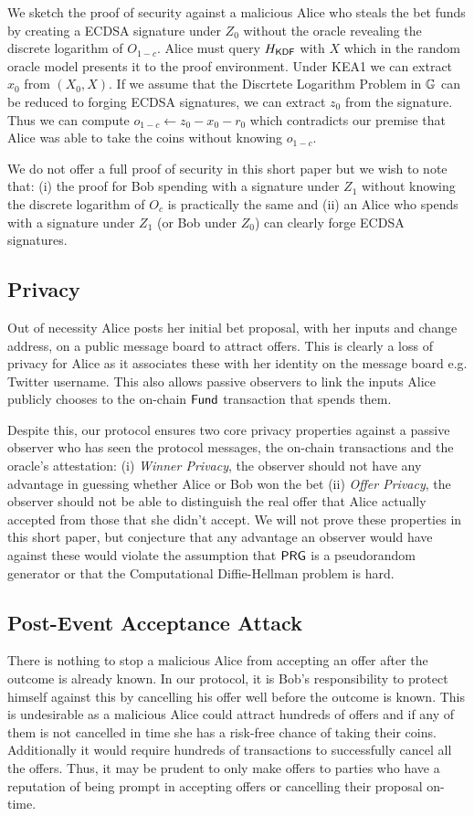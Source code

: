 \documentclass[runningheads]{llncs}
\begin{document}
We sketch the proof of security against a malicious Alice who steals the bet funds by creating a ECDSA signature under $Z_0$ without the oracle revealing the discrete logarithm of $O_{1-c}$. Alice must query $H_{\textsf{KDF}}$ with $X$ which in the random oracle model presents it to the proof environment. Under KEA1 we can extract $x_0$ from $(X_0,X)$. If we assume that the Discrtete Logarithm Problem in $\mathbb{G}$ can be reduced to forging ECDSA signatures, we can extract $z_0$ from the signature. Thus we can compute $o_{1-c} \gets z_0 - x_0 - r_0$ which contradicts our premise that Alice was able to take the coins without knowing $o_{1-c}$.

We do not offer a full proof of security in this short paper but we wish to note that: (i) the proof for Bob spending with a signature under $Z_1$ without knowing the discrete logarithm of $O_c$ is practically the same and (ii) an Alice who spends with a signature under $Z_1$ (or Bob under $Z_0$) can clearly forge ECDSA signatures.

\subsection{Privacy}

Out of necessity Alice posts her initial bet proposal, with her inputs and change address, on a public message board to attract offers. This is clearly a loss of privacy for Alice as it associates these with her identity on the message board e.g. Twitter username. This also allows passive observers to link the inputs Alice publicly chooses to the on-chain $\textsf{Fund}$ transaction that spends them.

Despite this, our protocol ensures two core privacy properties against a passive observer who has seen the protocol messages, the on-chain transactions and the oracle's attestation: (i) \emph{Winner Privacy}, the observer should not have any advantage in guessing whether Alice or Bob won the bet (ii) \emph{Offer Privacy}, the observer should not be able to distinguish the real offer that Alice actually accepted from those that she didn't accept. We will not prove these properties in this short paper, but conjecture that any advantage an observer would have against these would violate the assumption that $\textsf{PRG}$ is a pseudorandom generator or that the Computational Diffie-Hellman problem is hard.

\subsection{Post-Event Acceptance Attack}\label{post-event-acceptance-attack}
There is nothing to stop a malicious Alice from accepting an offer after the outcome is already known. In our protocol, it is Bob's responsibility to protect himself against this by cancelling his offer well before the outcome is known.
This is undesirable as a malicious Alice could attract hundreds of offers and if any of them is not cancelled in time  she has a risk-free chance of taking their coins.
Additionally it would require hundreds of transactions to successfully cancel all the offers. Thus, it may be prudent to only make offers to parties who have a reputation of being prompt in accepting offers or cancelling their proposal on-time.
\end{document}
